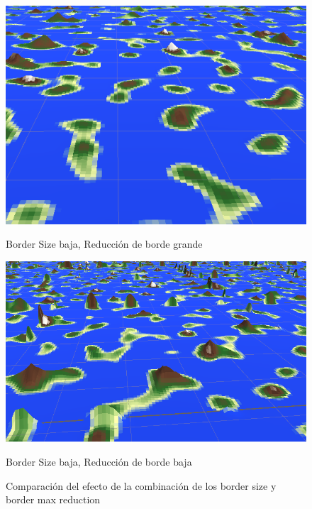 \begin{figure}[ht]
    \vspace{0.5cm} %
    
    \begin{minipage}{0.4\textwidth}
        \centering
        \includegraphics[width=\textwidth]{img/lowbordersize-hightborderred.png}
        \caption{Border Size baja, Reducción de borde grande}
    \end{minipage}%
    \hfill
    \begin{minipage}{0.4\textwidth}
        \centering
        \includegraphics[width=\textwidth]{img/lowbordersize-lowborderred.png}
        \caption{Border Size baja, Reducción de borde baja}
    \end{minipage}
    \caption{Comparación del efecto de la combinación de los border size y border max reduction}
\end{figure}

